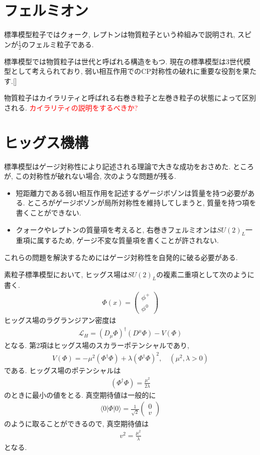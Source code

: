 \section{フェルミオン}
標準模型粒子ではクォーク, レプトンは物質粒子という枠組みで説明され, スピンが$\frac{1}{2}$のフェルミ粒子である.

標準模型では物質粒子は世代と呼ばれる構造をもつ.
現在の標準模型は3世代模型として考えられており, 弱い相互作用でのCP対称性の破れに重要な役割を果たす.[]

物質粒子はカイラリティと呼ばれる右巻き粒子と左巻き粒子の状態によって区別される.
\textcolor{red}{カイラリティの説明をするべきか?}
\section{ヒッグス機構}
標準模型はゲージ対称性により記述される理論で大きな成功をおさめた.
ところが, この対称性が破れない場合, 次のような問題が残る.
\begin{itemize}
  \item 短距離力である弱い相互作用を記述するゲージボゾンは質量を持つ必要がある. ところがゲージボゾンが局所対称性を維持してしまうと, 質量を持つ項を書くことができない.
  \item クォークやレプトンの質量項を考えると, 右巻きフェルミオンは$SU(2)_L$一重項に属するため, ゲージ不変な質量項を書くことが許されない.
\end{itemize}
これらの問題を解決するためにはゲージ対称性を自発的に破る必要がある.

素粒子標準模型において, ヒッグス場は$SU(2)_L$の複素二重項として次のように書く.
\begin{align}
  \Phi(x) = \left(
  \begin{array}{c}
    \phi^+ \\
    \phi^0
  \end{array}
  \right)
\end{align}
ヒッグス場のラグランジアン密度は
\begin{align}
  \mathcal{L}_H = \left(D_\mu \Phi\right)^\dagger (D^\mu \Phi) -V(\Phi) \label{L_H}
\end{align}
となる.
第2項はヒッグス場のスカラーポテンシャルであり,
\begin{align}
  V(\Phi) = -\mu^2 (\Phi^\dagger\Phi)+ {\lambda}(\Phi^\dagger \Phi)^2,\quad(\mu^2, \lambda>0)\label{V_H}
\end{align}
である.
ヒッグス場のポテンシャルは
\begin{align}
  (\Phi^\dagger \Phi) = \frac{\mu^2}{2\lambda}\nonumber
\end{align}
のときに最小の値をとる.
真空期待値は一般的に
\begin{align}
  \langle 0 |\Phi |0\rangle = \frac{1}{\sqrt{2}}\left(\begin{array}{c}
      0 \\
      v
  \end{array}\right)\label{Higgs_VEV}
\end{align}
のように取ることができるので, 真空期待値は
\begin{align}
  v^2 = \frac{\mu^2}{\lambda}\nonumber
\end{align}
となる.

